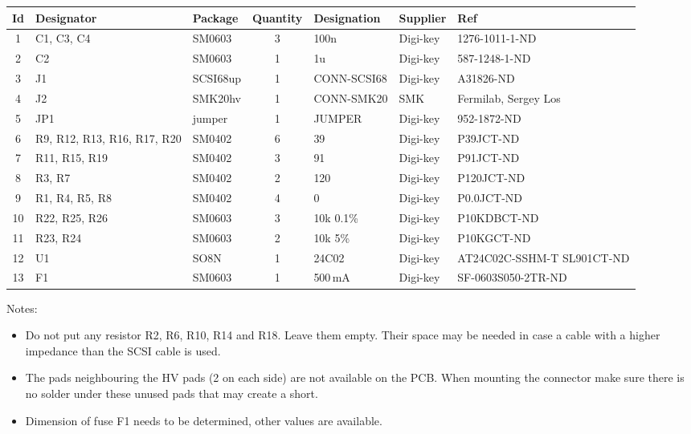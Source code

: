 {\footnotesize
\begin{tabular}{cp{2.2cm}lclll}
	\toprule %
Id & Designator & Package & Quantity & Designation & Supplier & Ref \\ 
	\midrule %
1 & C1, C3, C4 & SM0603 & 3 & 100n & Digi-key & 1276-1011-1-ND \\ 
2 & C2         & SM0603 & 1 & 1u & Digi-key & 587-1248-1-ND \\ 
3 & J1         & SCSI68up & 1 & CONN-SCSI68 & Digi-key & A31826-ND \\ 
4 & J2         & SMK20hv & 1 & CONN-SMK20 & SMK & Fermilab, Sergey Los \\ 
5 & JP1        & jumper & 1 & JUMPER & Digi-key & 952-1872-ND \\ 
6 & R9, R12, R13, R16, R17, R20 & SM0402 & 6 & 39 & Digi-key & P39JCT-ND \\ 
7 & R11, R15, R19 & SM0402 & 3 & 91 & Digi-key & P91JCT-ND \\ 
8 & R3, R7 & SM0402 & 2 & 120 & Digi-key & P120JCT-ND \\ 
9 & R1, R4, R5, R8 & SM0402 & 4 & 0 & Digi-key & P0.0JCT-ND \\ 
10 & R22, R25, R26 & SM0603 & 3 & 10k 0.1\% & Digi-key & P10KDBCT-ND \\ 
11 & R23, R24   & SM0603 & 2 & 10k 5\% & Digi-key & P10KGCT-ND \\ 
12 & U1        & SO8N & 1 & 24C02 & Digi-key & AT24C02C-SSHM-T SL901CT-ND \\ 
13 & F1        & SM0603 & 1 & 500\,mA & Digi-key & SF-0603S050-2TR-ND \\ 
	\bottomrule %
\end{tabular}
}

\bigskip

Notes:
\begin{itemize}
    \item Do not put any resistor R2, R6, R10, R14 and R18. Leave them empty. Their space may be needed in case a cable with a higher impedance than the SCSI cable is used.
    \item The pads neighbouring the HV pads (2 on each side) are not available on the PCB. When mounting the connector make sure there is no solder under these unused pads that may create a short.
    \item Dimension of fuse F1 needs to be determined, other values are available.
\end{itemize}


